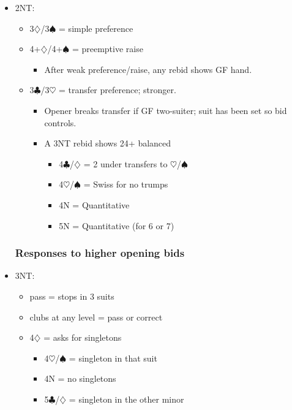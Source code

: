 \documentclass[a4paper,14pt]{extarticle}
\begin{document}
\begin{itemize}
\item 2NT:
	\begin{itemize}
   \item 3$\diamondsuit$/3$\spadesuit$ = simple preference
   \item 4+$\diamondsuit$/4+$\spadesuit$ = preemptive raise
		\begin{itemize}
      \item After weak preference/raise, any rebid shows GF hand.
		\end{itemize}
   \item 3$\clubsuit$/3$\heartsuit$ = transfer preference; stronger.
		\begin{itemize}
      \item Opener breaks transfer if GF two-suiter; suit has been set so bid controls.
      \item A 3NT rebid shows 24+ balanced
			\begin{itemize}
         \item 4$\clubsuit$/$\diamondsuit$ = 2 under transfers to $\heartsuit$/$\spadesuit$
         \item 4$\heartsuit$/$\spadesuit$ = Swiss for no trumps 
         \item 4N = Quantitative
         \item 5N = Quantitative (for 6 or 7)
			\end{itemize}
		\end{itemize}
	\end{itemize}

\newpage

\subsubsection{Responses to higher opening bids}
\label{sec:resp:higher}

\item 3NT:
	\begin{itemize}
	\item pass = stops in 3 suits
	\item clubs at any level = pass or correct
	\item 4$\diamondsuit$ = asks for singletons
		\begin{itemize}
		\item 4$\heartsuit$/$\spadesuit$ = singleton in that suit
		\item 4N = no singletons
		\item 5$\clubsuit$/$\diamondsuit$ = singleton in the other minor
		\end{itemize}
	\end{itemize}


\end{itemize}
\end{document}
